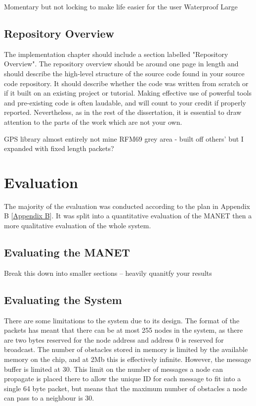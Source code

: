 \documentclass[12pt,a4paper]{report}
\newcommand{\newchapter}[2]{
    \setcounter{chapter}{#1}
    \setcounter{section}{0}
    \chapter*{#2}
    \addcontentsline{toc}{chapter}{#1 #2}
}
\begin{document}
Momentary but not locking to make life easier for the user 
Waterproof
Large



\section{Repository Overview}
The implementation chapter should include a section labelled "Repository Overview". The repository overview should be around one page in length and should describe the high-level structure of the source code found in your source code repository. It should describe whether the code was written from scratch or if it built on an existing project or tutorial. Making effective use of powerful tools and pre-existing code is often laudable, and will count to your credit if properly reported. Nevertheless, as in the rest of the dissertation, it is essential to draw attention to the parts of the work which are not your own.

GPS library almost entirely not mine
RFM69 grey area - built off others' but I expanded with fixed length packets? 


\newchapter{4}{Evaluation}
The majority of the evaluation was conducted according to the plan in Appendix B [\hyperref[appendixB]{Appendix B}]. It was split into a quantitative evaluation of the MANET then a more qualitative evaluation of the whole system.

\section{Evaluating the MANET}
Break this down into smaller sections -- heavily quanitfy your results

\section{Evaluating the System}
There are some limitations to the system due to its design. The format of the packets has meant that there can be at most 255 nodes in the system, as there are two bytes reserved for the node address and address 0 is reserved for broadcast. The number of obstacles stored in memory is limited by the available memory on the chip, and at 2Mb this is effectively infinite. However, the message buffer is limited at 30. This limit on the number of messages a node can propagate is placed there to allow the unique ID for each message to fit into a single 64 byte packet, but means that the maximum number of obstacles a node can pass to a neighbour is 30.
\end{document}
